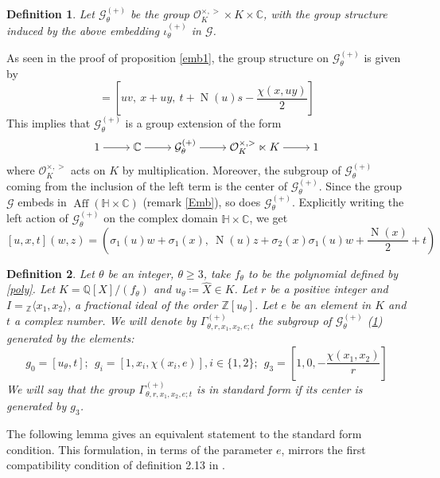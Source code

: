 \documentclass[12pt]{amsart}
\newtheorem{definition}{Definition}[section]
\newcommand{\Z}{\mathbb{Z}}
\newcommand{\C}{\mathbb{C}}
\newcommand{\Q}{\mathbb{Q}}
\newcommand{\HH}{\mathbb{H}}
\newcommand{\OO}{\mathcal{O}}
\DeclareMathOperator{\Aff}{Aff}
\DeclareMathOperator{\Norm}{N}
\begin{document}
\begin{definition}\label{Incl}
Let $\mathcal{G}_{\theta}^{(+)}$ be the group $\OO_K^{\times, >} \times K \times \C$, with the group structure induced by the above embedding $\iota_{\theta}^{(+)}$ in $\mathcal{G}$.
\end{definition}

\noindent
As seen in the proof of proposition \ref{emb1}, the group structure on $\mathcal{G}_\theta^{(+)}$ is given by 
\begin{equation*}[u,x,t][v,y,s]=\left[uv,\ x+uy,\ t+\Norm(u)s - \frac{\chi(x,uy)}{2}\right]
\end{equation*}
This implies that $\mathcal{G}_\theta^{(+)}$ is a group extension of the form
$$\begin{tikzcd}[ampersand replacement=\&,cramped]
	1 \& \C \& {\mathcal{G}_{\theta}^{(+)}} \& {\OO_K^{\times,>}\ltimes K} \& 1
	\arrow[from=1-1, to=1-2]
	\arrow[from=1-2, to=1-3]
	\arrow[from=1-3, to=1-4]
	\arrow[from=1-4, to=1-5]
\end{tikzcd}$$
where $\OO_K^{\times,>}$ acts on $K$ by multiplication. Moreover, the subgroup of $\mathcal{G}_{\theta}^{(+)}$ coming from the inclusion of the left term is the center of $\mathcal{G}_{\theta}^{(+)}$. Since the group $\mathcal{G}$ embeds in $\Aff(\HH \times \C) $ (remark \ref{Emb}), so does $\mathcal{G}_\theta^{(+)}$. Explicitly writing the left action of $\mathcal{G}_\theta^{(+)}$ on the complex domain $\HH\times \C$, we get
$$[u,x,t](w,z)=\left(\sigma_1(u)w + \sigma_1(x),\ \Norm(u)z + \sigma_2(x)\sigma_1(u)w + \frac{\Norm(x)}{2} + t\right)$$

\begin{definition}\label{gr}
Let $\theta$ be an integer, $\theta \geq 3$, take $f_\theta$ to be the polynomial defined by \ref{poly}. Let $K=\Q[X]/(f_\theta)$ and $u_\theta \coloneq \hat{X} \in K$. Let $r$ be a positive integer and $I = {}_\Z\langle x_1,x_2\rangle$, a fractional ideal of the order $\Z[u_\theta]$. Let $e$ be an element in $K$ and $t$ a complex number. We will denote by $\Gamma_{\theta,r,x_1,x_2,e;t}^{(+)}$ the subgroup of $\mathcal{G}_\theta^{(+)}$ (\ref{Incl}) generated by the elements:
$$g_0=[u_\theta,t];\ \ g_i=[1,x_i,\chi(x_i, e)], i \in \{1,2\};\ \ g_3=\left[1,0,-\frac{\chi(x_1,x_2)}{r}\right]$$
We will say that the group $\Gamma_{\theta,r,x_1,x_2,e;t}^{(+)}$ is in standard form if its center is generated by $g_3$.\par
\end{definition}

\noindent
The following lemma gives an equivalent statement to the standard form condition. This formulation, in terms of the parameter $e$, mirrors the first compatibility condition of definition 2.13 in \cite{KT}. 
\end{document}
